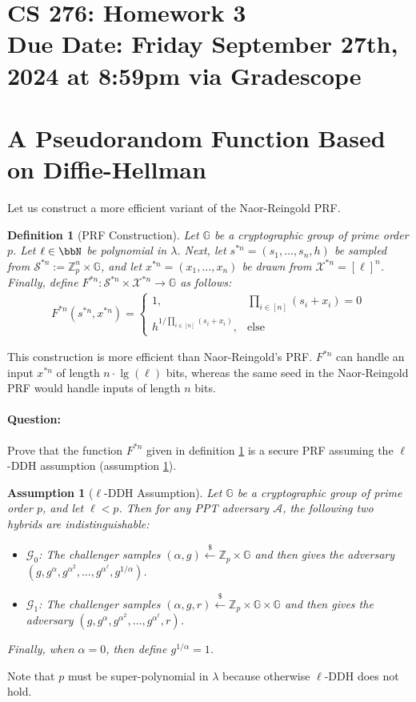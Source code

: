 \documentclass[11pt]{article}
\newtheorem{definition}[theorem]{Definition}
\newtheorem{assumption}[theorem]{Assumption}
\numberwithin{equation}{section}
\newcommand{\bbG}{\mathbb{G}}
\newcommand{\bbZ}{\mathbb{Z}}
\newcommand{\cA}{\mathcal{A}}
\newcommand{\cG}{\mathcal{G}}
\newcommand{\cS}{\mathcal{S}}
\newcommand{\cX}{\mathcal{X}}
\newcommand{\getsr}{\stackrel{\$}{\gets}}
\newcommand{\duedate}{Friday September 27th, 2024 at 8:59pm via Gradescope}
\begin{document}
\section*{CS 276: Homework 3\\ {\small Due Date: \duedate} }

\section{A Pseudorandom Function Based on Diffie-Hellman}
Let us construct a more efficient variant of the Naor-Reingold PRF. 

\begin{definition}[PRF Construction]\label{def:PRF-construction}
Let $\bbG$ be a cryptographic group of prime order $p$. Let $\ell \in \bbN$ be polynomial in $\lambda$. Next, let $s^{*n} = (s_1, \dots, s_n, h)$ be sampled from $\cS^{*n} := \bbZ_p^n \times \bbG$, and let $x^{*n} = (x_1, \dots, x_n)$ be drawn from $\cX^{*n} = [\ell]^n$. Finally, define $F^{*n}:\cS^{*n} \times \cX^{*n} \to \bbG$ as follows:
\begin{align*}
    F^{*n}(s^{*n}, x^{*n}) = 
    \begin{cases}
        1, & \prod_{i \in [n]}(s_i + x_i) = 0\\
        h^{1/\prod_{i \in [n]}(s_i + x_i)}, & \text{else}
    \end{cases}
\end{align*}
\end{definition}
This construction is more efficient than Naor-Reingold's PRF. $F^{*n}$ can handle an input $x^{*n}$ of length $n \cdot \lg(\ell)$ bits, whereas the same seed in the Naor-Reingold PRF would handle inputs of length $n$ bits.

\paragraph{Question:} Prove that the function $F^{*n}$ given in definition \ref{def:PRF-construction} is a secure PRF assuming the $\ell$-DDH assumption (assumption \ref{assumption:DDH-Variant}).

\begin{assumption}[$\ell$-DDH Assumption]\label{assumption:DDH-Variant}
Let $\bbG$ be a cryptographic group of prime order $p$, and let $\ell < p$. Then for any PPT adversary $\cA$, the following two hybrids are indistinguishable:
\begin{itemize}
    \item $\cG_0$: The challenger samples $(\alpha, g) \getsr \bbZ_p \times \bbG$ and then gives the adversary $(g, g^\alpha, g^{\alpha^2}, \dots, g^{\alpha^\ell}, g^{1/\alpha})$.
    \item $\cG_1$: The challenger samples $(\alpha, g, r) \getsr \bbZ_p \times \bbG \times \bbG$ and then gives the adversary $(g, g^\alpha, g^{\alpha^2}, \dots, g^{\alpha^\ell}, r)$.
\end{itemize}
Finally, when $\alpha = 0$, then define $g^{1/\alpha} = 1$.
\end{assumption}
Note that $p$ must be super-polynomial in $\lambda$ because otherwise $\ell$-DDH does not hold.
\end{document}
